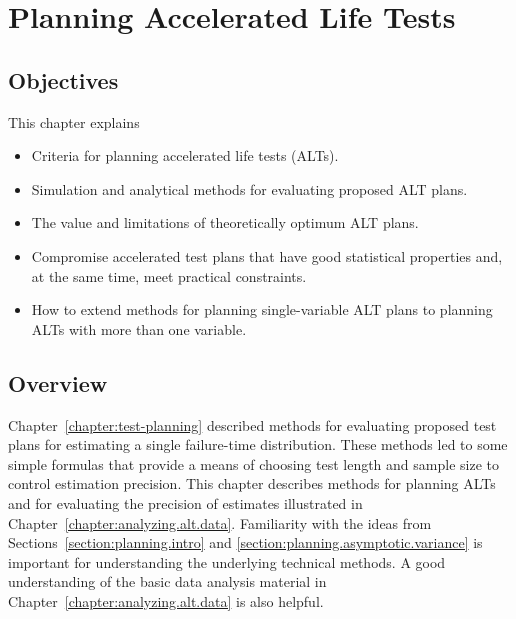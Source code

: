 
\setcounter{chapter}{19}

\chapter{Planning Accelerated Life Tests}

\label{chapter:alt.test.planning}



\section*{Objectives}
This chapter explains
\begin{itemize} 
\item 
Criteria for planning accelerated life tests (ALTs).
\item 
Simulation and analytical methods for evaluating proposed ALT plans.
\item 
The value and limitations of theoretically optimum ALT plans.
\item
Compromise accelerated test plans that have good statistical
properties and, at the same time, meet practical constraints.
\item
How to extend methods for planning single-variable ALT plans to
planning ALTs with more than one variable.
\end{itemize}


\section*{Overview}
Chapter~\ref{chapter:test-planning} described methods for evaluating
proposed test plans for estimating a single failure-time
distribution.  These methods led to some simple formulas that
provide a means of choosing test length and sample size to control
estimation precision.  This chapter describes methods for planning
ALTs
and for evaluating
the precision of estimates illustrated in
Chapter~\ref{chapter:analyzing.alt.data}.  Familiarity with the
ideas from Sections~\ref{section:planning.intro} and
\ref{section:planning.asymptotic.variance} is important for
understanding the underlying technical methods. A good understanding
of the basic data analysis material in
Chapter~\ref{chapter:analyzing.alt.data} is also helpful.

